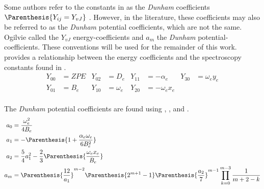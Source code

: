     Some authors refer to the constants in  
    as the \textit{Dunham} coefficients \cite{Dunham1932} $\Parenthesis{Y_{ij}
    = Y_{vJ}}$ \cite{Chandra2005}. However, in the literature, these
    coefficients may also be referred to as the \textit{Dunham} potential
    coefficients, which are not the same. Ogilvie \cite{Ogilvie1976} called the
    $Y_{vJ}$ energy-coefficients and $a_m$ the \textit{Dunham}
    potential-coefficients. These conventions will be used for the remainder
    of this work.  provides a relationship between the
    energy coefficients and the spectroscopy constants found in
    .
    \begin{equation}\label{eq:dunhamEnergyCoefficients}
        \begin{aligned}
            Y_{00} &= ZPE   &  Y_{02} &= D_e        & Y_{11} &= -\alpha_e   &
            Y_{30} &= \omega_e y_e  \\
            Y_{01} &= B_e   &  Y_{10} &= \omega_e   & Y_{20} &= -\omega_ex_e &  \\ 
        \end{aligned}
    \end{equation}

    The \textit{Dunham} potential coefficients are found using
     \cite{Ogilvie1976}, 
    \cite{Herschbach1961}, and 
    \cite{Noorizadeh2004}.
    \begin{subequations}\label{eq:dunhamPotentialCoefficients}
        \begin{align}
            a_0 &= \frac{\omega_e^2}{4B_e} \label{eq:dunhamA0} \\
            a_1 &= -\Parenthesis{1 + \frac{\alpha_e\omega_e}{6B_e^2}} \label{eq:dunhamA1} \\
            a_2 &= \frac{5}{4}a_1^2 -
            \frac{2}{3}\Parenthesis{\frac{\omega_ex_e}{B_e}} \label{eq:dunhamA2} \\
            a_m &= \Parenthesis{\frac{12}{a_1}}^{m-2} \Parenthesis{2^{m+1}-1 }\Parenthesis{ \frac{a_2}{7}}^{m-1}\prod_{k=0}^{m-3}\frac{1}{m+2 - k} \label{eq:dunhamA3}
        \end{align}
    \end{subequations}

